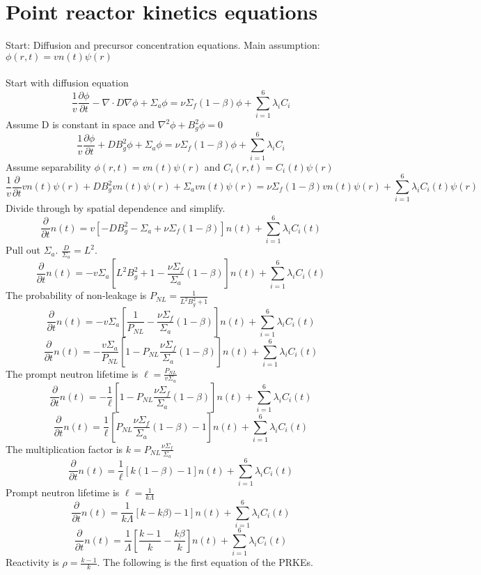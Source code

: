 \documentclass[]{article}
\begin{document}
		\section*{\textbf{Point reactor kinetics equations}} Start: Diffusion and precursor concentration equations. Main assumption: $\phi(r,t) = vn(t)\psi(r)$\\\\ Start with diffusion equation
	\[
	\frac{1}{v}\frac{\partial \phi}{\partial t} - \nabla \cdot D\nabla\phi + \Sigma_a\phi = \nu \Sigma_f(1-\beta)\phi+\sum_{i=1}^{6}\lambda_i C_i
	\]
	Assume D is constant in space and $\nabla^2\phi + B_g^2\phi = 0$
	\[
	\frac{1}{v}\frac{\partial \phi}{\partial t} + DB_g^2\phi + \Sigma_a\phi = \nu \Sigma_f(1-\beta)\phi+\sum_{i=1}^{6}\lambda_i C_i
	\]
	Assume separability $\phi(r,t) = vn(t)\psi(r)$ and $C_i(r,t) = C_i(t)\psi(r)$
	\[
	\frac{1}{v}\frac{\partial}{\partial t}vn(t)\psi(r) + DB_g^2 vn(t)\psi(r) + \Sigma_avn(t)\psi(r) = \nu \Sigma_f(1-\beta)vn(t)\psi(r) +\sum_{i=1}^{6}\lambda_i C_i(t)\psi(r)
	\]
	Divide through by spatial dependence and simplify.
	\[
	\frac{\partial}{\partial t}n(t)= v[-DB_g^2 - \Sigma_a +\nu \Sigma_f(1-\beta)]n(t)+\sum_{i=1}^{6}\lambda_i C_i(t)
	\]
	Pull out $\Sigma_a$. $\frac{D}{\Sigma_a} = L^2$.
	\[
	\frac{\partial}{\partial t}n(t)= -v\Sigma_a[L^2B_g^2 + 1 -\frac{\nu \Sigma_f}{\Sigma_a}(1-\beta)]n(t)+\sum_{i=1}^{6}\lambda_i C_i(t)
	\]
	The probability of non-leakage is $P_{NL} = \frac{1}{L^2B_g^2 + 1}$
	\[
	\frac{\partial}{\partial t}n(t)= -v\Sigma_a[\frac{1}{P_{NL}} -\frac{\nu \Sigma_f}{\Sigma_a}(1-\beta)]n(t)+\sum_{i=1}^{6}\lambda_i C_i(t)
	\]
	\[
	\frac{\partial}{\partial t}n(t)= -\frac{v\Sigma_a}{P_{NL}}[1 -P_{NL}\frac{\nu \Sigma_f}{\Sigma_a}(1-\beta)]n(t)+\sum_{i=1}^{6}\lambda_i C_i(t)
	\]
	The prompt neutron lifetime is $\ell = \frac{P_{NL}}{v\Sigma_a}$
	\[
	\frac{\partial}{\partial t}n(t)= -\frac{1}{\ell}[1 -P_{NL}\frac{\nu \Sigma_f}{\Sigma_a}(1-\beta)]n(t)+\sum_{i=1}^{6}\lambda_i C_i(t)
	\]
	\[
	\frac{\partial}{\partial t}n(t)= \frac{1}{\ell}[P_{NL}\frac{\nu \Sigma_f}{\Sigma_a}(1-\beta)-1]n(t)+\sum_{i=1}^{6}\lambda_i C_i(t)
	\]
	The multiplication factor is $k=P_{NL}\frac{\nu \Sigma_f}{\Sigma_a}$
	\[
	\frac{\partial}{\partial t}n(t)= \frac{1}{\ell}[k(1-\beta)-1]n(t)+\sum_{i=1}^{6}\lambda_i C_i(t)
	\]
	Prompt neutron lifetime is $\ell=\frac{1}{k\Lambda}$
	\[
	\frac{\partial}{\partial t}n(t)= \frac{1}{k\Lambda}[k-k\beta)-1]n(t)+\sum_{i=1}^{6}\lambda_i C_i(t)
	\]
	\[
	\frac{\partial}{\partial t}n(t)= \frac{1}{\Lambda}[\frac{k-1}{k}-\frac{k\beta}{k}]n(t)+\sum_{i=1}^{6}\lambda_i C_i(t)
	\]
	Reactivity is $\rho=\frac{k-1}{k}$. The following is the first equation of the PRKEs.
\end{document}
